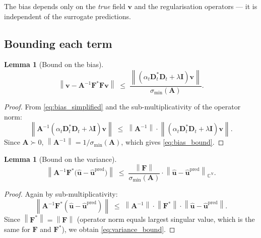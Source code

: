 \documentclass[11pt, a4paper]{article}
\newtheorem{lemma}[theorem]{Lemma}
\newcommand{\C}{\mathbb{C}}
\newcommand{\norm}[1]{\left\|#1\right\|}
\begin{document}
The bias depends only on the \emph{true} field $\mathbf{v}$ and the
regularisation operators --- it is independent of the surrogate predictions.

\subsection{Bounding each term}

\begin{lemma}[Bound on the bias]
  \label{lem:bias}
  \begin{equation}
    \label{eq:bias_bound}
    \norm{\mathbf{v} - \mathbf{A}^{-1}\mathbf{F}^*\mathbf{F}\mathbf{v}}
    \;\leq\;
    \frac{\norm{(\alpha_t\mathbf{D}_t^*\mathbf{D}_t + \lambda\mathbf{I})\mathbf{v}}}
         {\sigma_{\min}(\mathbf{A})}.
  \end{equation}
\end{lemma}

\begin{proof}
  From \eqref{eq:bias_simplified} and the sub-multiplicativity of the
  operator norm:
  \[
    \norm{\mathbf{A}^{-1}
          (\alpha_t\mathbf{D}_t^*\mathbf{D}_t + \lambda\mathbf{I})\mathbf{v}}
    \;\leq\;
    \norm{\mathbf{A}^{-1}}
    \cdot
    \norm{(\alpha_t\mathbf{D}_t^*\mathbf{D}_t + \lambda\mathbf{I})\mathbf{v}}.
  \]
  Since $\mathbf{A} \succ 0$,
  $\norm{\mathbf{A}^{-1}} = 1/\sigma_{\min}(\mathbf{A})$,
  which gives \eqref{eq:bias_bound}.
\end{proof}

\begin{lemma}[Bound on the variance]
  \label{lem:variance}
  \begin{equation}
    \label{eq:variance_bound}
    \norm{\mathbf{A}^{-1}\mathbf{F}^*
          \bigl(\hat{\mathbf{u}} - \hat{\mathbf{u}}^{\mathrm{pred}}\bigr)}
    \;\leq\;
    \frac{\norm{\mathbf{F}}}
         {\sigma_{\min}(\mathbf{A})}
    \cdot
    \norm{\hat{\mathbf{u}} - \hat{\mathbf{u}}^{\mathrm{pred}}}_{\C^N}.
  \end{equation}
\end{lemma}

\begin{proof}
  Again by sub-multiplicativity:
  \[
    \norm{\mathbf{A}^{-1}\mathbf{F}^*
          (\hat{\mathbf{u}} - \hat{\mathbf{u}}^{\mathrm{pred}})}
    \;\leq\;
    \norm{\mathbf{A}^{-1}}
    \cdot \norm{\mathbf{F}^*}
    \cdot \norm{\hat{\mathbf{u}} - \hat{\mathbf{u}}^{\mathrm{pred}}}.
  \]
  Since $\norm{\mathbf{F}^*} = \norm{\mathbf{F}}$
  (operator norm equals largest singular value, which is the same for
  $\mathbf{F}$ and $\mathbf{F}^*$), we obtain \eqref{eq:variance_bound}.
\end{proof}
\end{document}
